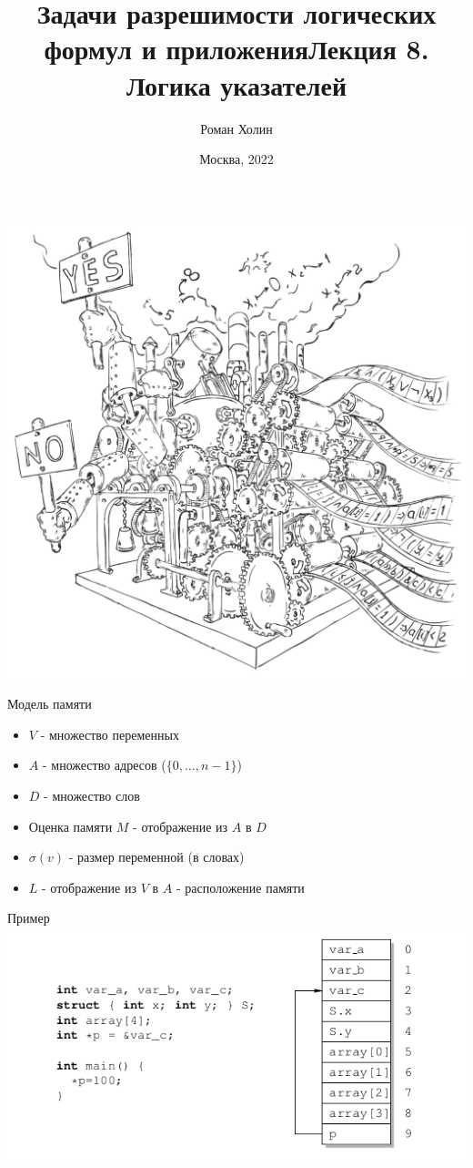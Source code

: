 \documentclass{beamer}
\begin{document}
\title{Задачи разрешимости логических формул и приложения\newline Лекция 8. Логика указателей}
\author{Роман Холин}
\date{Москва, 2022}

\begin{frame}
\includegraphics[scale=0.5]{../decision-procedure.png}
\end{frame}

\frame{\titlepage}

\begin{frame}{Модель памяти}
\begin{itemize}
\item $V$ - множество переменных
\item $A$ - множество адресов ($\{0, \dots, n-1\}$)
\item $D$ - множество слов
\item Оценка памяти $M$ - отображение из  $A$ в $D$
\item $\sigma(v)$ - размер переменной (в словах)
\item $L$ - отображение из $V$ в $A$ - расположение памяти
\end{itemize}
\end{frame}

\begin{frame}{Пример}
\includegraphics[scale=0.5]{layout.png}
\end{frame}
\end{document}

